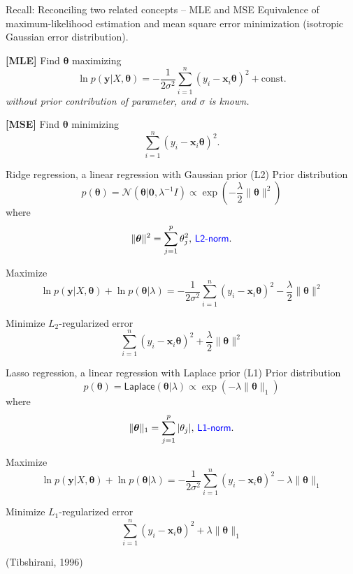 \documentclass[
  ignorenonframetext,
  aspectratio=169]{beamer}
\begin{document}
\begin{frame}{Recall: Reconciling two related concepts -- MLE and MSE}
\protect\hypertarget{recall-reconciling-two-related-concepts-mle-and-mse}{}
Equivalence of maximum-likelihood estimation and mean square error
minimization (isotropic Gaussian error distribution).

\vfill

\textbf{{[}MLE{]}} Find \({\boldsymbol{\theta}}\) maximizing \[
\ln p(\mathbf{y}|X,\boldsymbol{\theta})
= - \frac{1}{2\sigma^{2}} \sum_{i=1}^{n} (y_{i} - \mathbf{x}_{i} \boldsymbol{\theta})^{2} + \textrm{const.}
\] \emph{without prior contribution of parameter, and \(\sigma\) is
known.}

\vfill

\textbf{{[}MSE{]}} Find \(\boldsymbol{\theta}\) minimizing \[
\sum_{i=1}^{n} (y_{i} - \mathbf{x}_{i} \boldsymbol{\theta})^{2}.
\]
\end{frame}

\begin{frame}{Ridge regression, a linear regression with Gaussian prior
(L2)}
\protect\hypertarget{ridge-regression-a-linear-regression-with-gaussian-prior-l2}{}
Prior distribution \[
p(\boldsymbol{\theta}) = \mathcal{N}\!\left(\boldsymbol{\theta}|\mathbf{0}, \lambda^{-1} I\right) \propto \exp\left(-\frac{\lambda}{2}\|\boldsymbol{\theta}\|^{2}\right)
\] where \large
\[\|\boldsymbol{\theta}\|^{2} = \sum_{j=1}^{p} \theta_{j}^{2},\,\textsf{\color{blue}L2-norm}.\]

\normalsize

Maximize \[
\ln p(\mathbf{y}|X,\boldsymbol{\theta}) + \ln p(\boldsymbol{\theta}|\lambda)
= - \frac{1}{2\sigma^{2}} \sum_{i=1}^{n} (y_{i} - \mathbf{x}_{i} \boldsymbol{\theta})^{2}
- \frac{\lambda}{2} \|\boldsymbol{\theta}\|^{2}
\]

Minimize \(L_{2}\)-regularized error \[
\sum_{i=1}^{n} (y_{i} - \mathbf{x}_{i} \boldsymbol{\theta})^{2}
+ \frac{\lambda}{2} \|\boldsymbol{\theta}\|^{2}
\]
\end{frame}

\begin{frame}{Lasso regression, a linear regression with Laplace prior
(L1)}
\protect\hypertarget{lasso-regression-a-linear-regression-with-laplace-prior-l1}{}
Prior distribution \[
p(\boldsymbol{\theta}) = \textsf{Laplace}(\boldsymbol{\theta}| \lambda) \propto \exp\left(-\lambda\|\boldsymbol{\theta}\|_{1}\right)
\] where \large
\[\|\boldsymbol{\theta}\|_{1} = \sum_{j=1}^{p} |\theta_{j}|,\,\textsf{\color{blue}L1-norm}.\]

\normalsize

Maximize \[
\ln p(\mathbf{y}|X,\boldsymbol{\theta}) + \ln p(\boldsymbol{\theta}|\lambda)
= - \frac{1}{2\sigma^{2}} \sum_{i=1}^{n} (y_{i} - \mathbf{x}_{i} \boldsymbol{\theta})^{2}
- \lambda \|\boldsymbol{\theta}\|_{1}
\]

Minimize \(L_{1}\)-regularized error \[
\sum_{i=1}^{n} (y_{i} - \mathbf{x}_{i} \boldsymbol{\theta})^{2}
+ \lambda \|\boldsymbol{\theta}\|_{1}
\]

(Tibshirani, 1996)
\end{frame}
\end{document}
